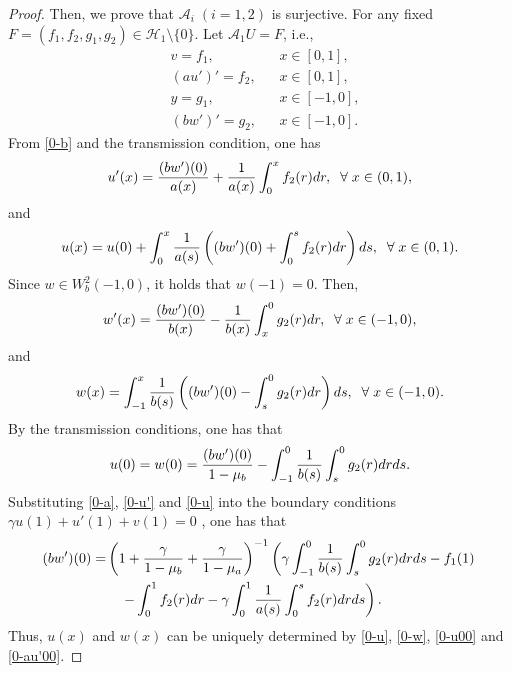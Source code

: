 \documentclass[10pt,a4paper]{amsart}
\begin{document}
\begin{proof}
Then, we prove that $\mathcal A_i\;(i=1,2)$ is surjective. For any fixed $F= (f_1,f_2,g_1,g_2)\in \mathcal H_1\setminus\{0\}$. Let $\mathcal A_1U = F$, i.e.,
\begin{subequations}
	\begin{align}
		&v=f_1,&&x\in[0,1],\label{0-a}\\
		&(au')'=f_2,&&x\in[0,1],\label{0-b}\\
		&y=g_1,&&x\in[-1,0],\label{0-c}\\
		&(bw')'= g_2,&&x\in[-1,0].\label{0-d}
	\end{align}
\end{subequations}
From \eqref{0-b} and the transmission condition, one has
\begin{equation}\label{0-u'}
	u'(x)={(bw')(0)\over a(x)}+{1\over a(x)}\int_0^x f_2(r)dr,\;\;\forall\;x\in(0,1),
\end{equation}
and
\begin{equation}\label{0-u}
	u(x) = u(0) + \int_0^x {1\over a(s)}\left((bw')(0)+\int_0^s f_2(r)dr\right) ds,\;\;\forall\;x\in(0,1).
\end{equation}
Since $w\in W_b^2(-1,0)$, it holds that $w(-1) =0$. Then,
\begin{equation}\label{0-w'}
	w'(x) = {(bw')(0)\over b(x)} - {1\over b(x)}\int_x^0 g_2(r)dr,\;\;\forall\;x\in(-1,0),
\end{equation}
and
\begin{equation}\label{0-w}
	w(x) = \int_{-1}^x {1\over b(s)} \left( (bw')(0)  -  \int_s^0 g_2(r)dr\right) ds,\;\;\forall\;x\in(-1,0).
\end{equation}
By the transmission conditions, one has that
\begin{equation}\label{0-u00}
	u(0) = w(0) = {(bw')(0)\over 1-\mu_b} - \int_{-1}^0{1\over b(s)} \int_s^0 g_2(r)dr ds.
\end{equation}
Substituting \eqref{0-a}, \eqref{0-u'} and \eqref{0-u} into the boundary conditions $\gamma u(1) + u'(1) +v(1) =0$ , one has that
\begin{equation}\label{0-au'00}
	\begin{split}
		(bw')(0) = &\left(1 + {\gamma\over1-\mu_b}+{\gamma\over1-\mu_a}\right)^{-1}
		\left(\gamma\int_{-1}^0 {1\over b(s)}\int_s^0 g_2(r) dr ds - f_1(1)\right.\\
		&\left.\quad-\int_0^1 f_2(r)dr
		- \gamma\int_0^1{1\over a(s)}\int_0^sf_2(r)dr ds \right).
	\end{split}
\end{equation}
Thus, $u(x)$ and $w(x)$ can be uniquely determined by \eqref{0-u}, \eqref{0-w}, \eqref{0-u00} and \eqref{0-au'00}.


\end{proof}
\end{document}
